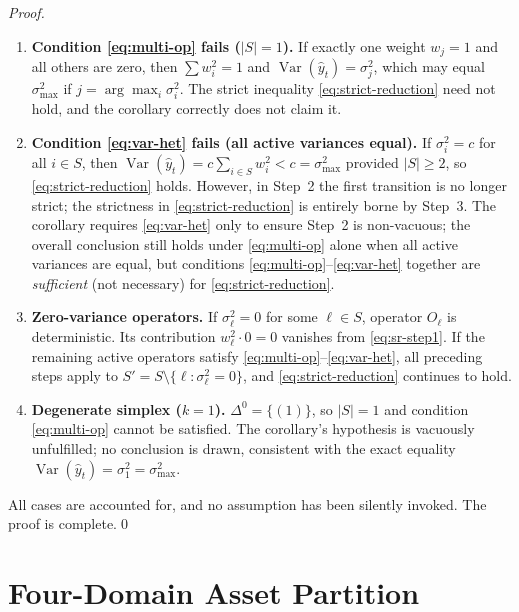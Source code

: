 \documentclass[12pt,openany]{book}
\numberwithin{equation}{chapter}
\theoremstyle{plain}
\theoremstyle{definition}
\theoremstyle{remark}
\numberwithin{equation}{chapter}
\theoremstyle{plain}
\DeclareMathOperator{\Var}{Var}
\begin{document}
\begin{proof}
\begin{enumerate}
  \item \textbf{Condition \eqref{eq:multi-op} fails ($|S| = 1$).}
        If exactly one weight $w_j = 1$ and all others are zero, then
        $\sum w_i^2 = 1$ and $\Var(\hat{y}_t) = \sigma_j^2$, which may
        equal $\sigma_{\max}^2$ if $j = \arg\max_i \sigma_i^2$.
        The strict inequality \eqref{eq:strict-reduction} need not hold,
        and the corollary correctly does not claim it.
  \item \textbf{Condition \eqref{eq:var-het} fails (all active variances equal).}
        If $\sigma_i^2 = c$ for all $i \in S$, then
        $\Var(\hat{y}_t) = c \sum_{i \in S} w_i^2 < c = \sigma_{\max}^2$
        provided $|S| \geq 2$, so \eqref{eq:strict-reduction} holds.
        However, in Step~2 the first transition is no longer strict; the
        strictness in \eqref{eq:strict-reduction} is entirely borne by
        Step~3.  The corollary requires \eqref{eq:var-het} only to ensure
        Step~2 is non-vacuous; the overall conclusion still holds under
        \eqref{eq:multi-op} alone when all active variances are equal,
        but conditions \eqref{eq:multi-op}--\eqref{eq:var-het} together
        are \emph{sufficient} (not necessary) for \eqref{eq:strict-reduction}.
  \item \textbf{Zero-variance operators.}
        If $\sigma_\ell^2 = 0$ for some $\ell \in S$, operator $O_\ell$
        is deterministic.  Its contribution $w_\ell^2 \cdot 0 = 0$ vanishes
        from \eqref{eq:sr-step1}.  If the remaining active operators satisfy
        \eqref{eq:multi-op}--\eqref{eq:var-het}, all preceding steps apply
        to $S' = S \setminus \{\ell : \sigma_\ell^2 = 0\}$, and
        \eqref{eq:strict-reduction} continues to hold.
  \item \textbf{Degenerate simplex ($k = 1$).}
        $\Delta^{0} = \{(1)\}$, so $|S| = 1$ and condition
        \eqref{eq:multi-op} cannot be satisfied.
        The corollary's hypothesis is vacuously unfulfilled; no conclusion
        is drawn, consistent with the exact equality
        $\Var(\hat{y}_t) = \sigma_1^2 = \sigma_{\max}^2$.
\end{enumerate}

\noindent All cases are accounted for, and no assumption has been silently
invoked.  The proof is complete.\qed
\end{proof}

\chapter{Four-Domain Asset Partition}
\label{ch:four-domain}
\end{document}
